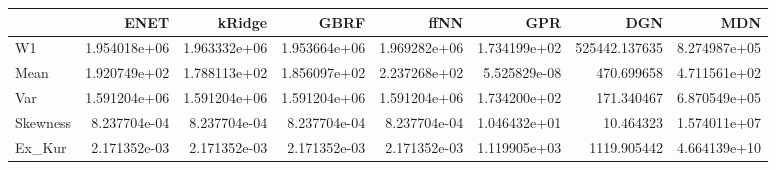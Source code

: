 \begin{tabular}{lrrrrrrr}
\toprule
{} &          ENET &        kRidge &          GBRF &          ffNN &           GPR &            DGN &           MDN \\
\midrule
W1       &  1.954018e+06 &  1.963332e+06 &  1.953664e+06 &  1.969282e+06 &  1.734199e+02 &  525442.137635 &  8.274987e+05 \\
Mean     &  1.920749e+02 &  1.788113e+02 &  1.856097e+02 &  2.237268e+02 &  5.525829e-08 &     470.699658 &  4.711561e+02 \\
Var      &  1.591204e+06 &  1.591204e+06 &  1.591204e+06 &  1.591204e+06 &  1.734200e+02 &     171.340467 &  6.870549e+05 \\
Skewness &  8.237704e-04 &  8.237704e-04 &  8.237704e-04 &  8.237704e-04 &  1.046432e+01 &      10.464323 &  1.574011e+07 \\
Ex\_Kur   &  2.171352e-03 &  2.171352e-03 &  2.171352e-03 &  2.171352e-03 &  1.119905e+03 &    1119.905442 &  4.664139e+10 \\
\bottomrule
\end{tabular}
